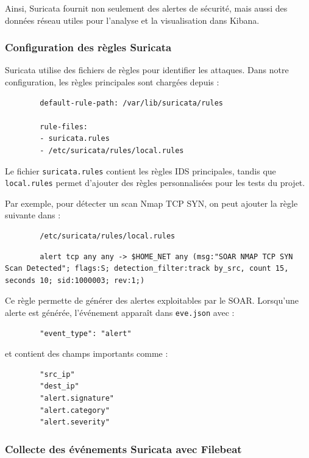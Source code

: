 \documentclass[12pt,a4paper,oneside]{report}
\begin{document}
	Ainsi, Suricata fournit non seulement des alertes de sécurité, mais aussi des données réseau utiles pour l'analyse et la visualisation dans Kibana.
	
	\subsubsection{Configuration des règles Suricata}
	
	Suricata utilise des fichiers de règles pour identifier les attaques. Dans notre configuration, les règles principales sont chargées depuis :
	
	\begin{lstlisting}
		default-rule-path: /var/lib/suricata/rules
		
		rule-files:
		- suricata.rules
		- /etc/suricata/rules/local.rules
	\end{lstlisting}
	
	Le fichier \texttt{suricata.rules} contient les règles IDS principales, tandis que \texttt{local.rules} permet d'ajouter des règles personnalisées pour les tests du projet.
	
	Par exemple, pour détecter un scan Nmap TCP SYN, on peut ajouter la règle suivante dans :
	
	\begin{lstlisting}
		/etc/suricata/rules/local.rules
	\end{lstlisting}
	
	\begin{lstlisting}
		alert tcp any any -> $HOME_NET any (msg:"SOAR NMAP TCP SYN Scan Detected"; flags:S; detection_filter:track by_src, count 15, seconds 10; sid:1000003; rev:1;)
	\end{lstlisting}
	
	Ce règle permette de générer des alertes exploitables par le SOAR. Lorsqu'une alerte est générée, l'événement apparaît dans \texttt{eve.json} avec :
	
	\begin{lstlisting}
		"event_type": "alert"
	\end{lstlisting}
	
	et contient des champs importants comme :
	
	\begin{lstlisting}
		"src_ip"
		"dest_ip"
		"alert.signature"
		"alert.category"
		"alert.severity"
	\end{lstlisting}

	\subsubsection{Collecte des événements Suricata avec Filebeat}
	
\end{document}

